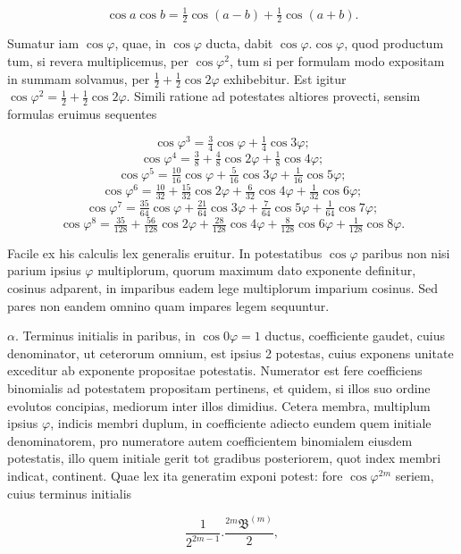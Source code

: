 \[ \cos a \cos b = \tfrac12\cos(a-b)+\tfrac12\cos(a+b). \]

\par\noindent\hspace*{\parindent}Sumatur iam $\cos\varphi$, quae, in $\cos\varphi$ ducta, dabit
$\cos\varphi . \cos\varphi$, quod productum tum, si revera multiplicemus,
per $\cos\varphi^2$, tum si per formulam modo expositam in summam
solvamus, per $\tfrac12+\tfrac12\cos 2\varphi$ exhibebitur. Est igitur
$\cos\varphi^2 = \tfrac12+\tfrac12\cos 2\varphi$. Simili ratione ad
potestates altiores provecti, sensim formulas eruimus sequentes

\[ \cos\varphi^3 = \tfrac34\cos\varphi + \tfrac14\cos 3\varphi ; \]
\[ \cos\varphi^4 = \tfrac38 + \tfrac48\cos 2\varphi + \tfrac18\cos 4\varphi ; \]
\[ \cos\varphi^5 = \tfrac{10}{16}\cos\varphi + \tfrac{5}{16}\cos 3\varphi + \tfrac{1}{16}\cos 5\varphi ; \]
\[ \cos\varphi^6 = \tfrac{10}{32} + \tfrac{15}{32}\cos 2\varphi + \tfrac{6}{32}\cos 4\varphi + \tfrac{1}{32}\cos 6\varphi ; \]
\[ \cos\varphi^7 = \tfrac{35}{64}\cos\varphi + \tfrac{21}{64}\cos 3\varphi + \tfrac{7}{64}\cos 5\varphi + \tfrac{1}{64}\cos 7\varphi ; \]
\[ \cos\varphi^8 = \tfrac{35}{128} + \tfrac{56}{128}\cos 2\varphi + \tfrac{28}{128}\cos 4\varphi + \tfrac{8}{128}\cos 6\varphi + \tfrac{1}{128}\cos 8\varphi . \]

\par\noindent Facile ex his calculis lex generalis eruitur. In potestatibus $\cos\varphi$
paribus non nisi parium ipsius $\varphi$ multiplorum, quorum maximum dato
exponente definitur, cosinus adparent, in imparibus eadem lege multiplorum
imparium cosinus. Sed pares non eandem omnino quam impares legem sequuntur.

$\alpha$. Terminus initialis in paribus, in $\cos 0\varphi = 1$ ductus,
coefficiente gaudet, cuius denominator, ut ceterorum omnium, est ipsius 2
potestas, cuius exponens unitate exceditur ab exponente propositae
potestatis. Numerator est fere coefficiens binomialis ad potestatem
propositam pertinens, et quidem, si illos suo ordine evolutos concipias,
mediorum inter illos dimidius. Cetera membra, multiplum ipsius $\varphi$,
indicis membri duplum, in coefficiente adiecto eundem quem initiale
denominatorem, pro numeratore autem coefficientem binomialem eiusdem
potestatis, illo quem initiale gerit tot gradibus posteriorem, quot index
membri indicat, continent. Quae lex ita generatim exponi potest: fore
$\cos\varphi^{2m}$ seriem, cuius terminus initialis

\[ \frac{1}{2^{2m-1}} . \frac{{}^{2m}\mathfrak{B}^{(m)}}{2}, \]
